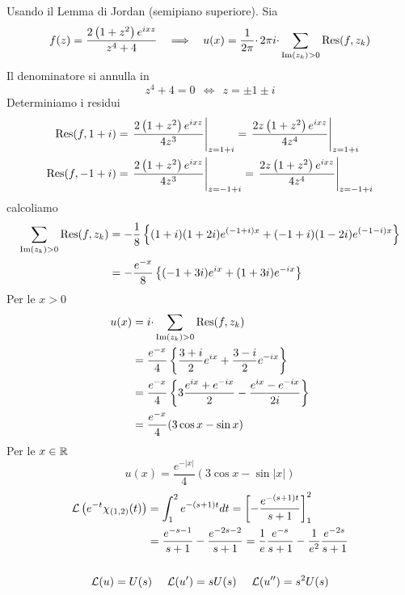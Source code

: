 Usando il Lemma di Jordan (semipiano superiore). Sia
\begin{equation*}
f( z) =\frac{2\left( 1+z^{2}\right) e^{ixz}}{z^{4} +4} \ \ \implies \ \ u( x) =\frac{1}{2\pi } \cdotp 2\pi i\cdotp \sum _{\operatorname{Im} ( z_{k})  >0}\operatorname{Res} ( f,z_{k})
\end{equation*}
Il denominatore si annulla in
\begin{equation*}
z^{4} +4=0\ \ \iff \ \ z=\pm 1\pm i
\end{equation*}
Determiniamo i residui
\begin{align*}
\operatorname{Res} ( f,1+i) & =\left. \frac{2\left( 1+z^{2}\right) e^{ixz}}{4z^{3}}\right| _{z=1+i} =\left. \frac{2z\left( 1+z^{2}\right) e^{ixz}}{4z^{4}}\right| _{z=1+i}\\
\operatorname{Res} ( f,-1+i) & =\left. \frac{2\left( 1+z^{2}\right) e^{ixz}}{4z^{3}}\right| _{z=-1+i} =\left. \frac{2z\left( 1+z^{2}\right) e^{ixz}}{4z^{4}}\right| _{z=-1+i}
\end{align*}
calcoliamo
\begin{align*}
\sum _{\operatorname{Im} ( z_{k})  >0}\operatorname{Res} ( f,z_{k}) & =-\frac{1}{8}\left\{( 1+i)( 1+2i) e^{( -1+i) x} +( -1+i)( 1-2i) e^{( -1-i) x}\right\}\\
 & =-\frac{e^{-x}}{8}\left\{( -1+3i) e^{ix} +( 1+3i) e^{-ix}\right\}
\end{align*}
Per le $x >0$
\begin{align*}
u( x) & =i\cdotp \sum _{\operatorname{Im} ( z_{k})  >0}\operatorname{Res} ( f,z_{k})\\
 & =\frac{e^{-x}}{4}\left\{\frac{3+i}{2} e^{ix} +\frac{3-i}{2} e^{-ix}\right\}\\
 & =\frac{e^{-x}}{4}\left\{3\frac{e^{ix} +e^{-ix}}{2} -\frac{e^{ix} -e^{-ix}}{2i}\right\}\\
 & =\frac{e^{-x}}{4}( 3\cos x-\sin x)
\end{align*}
Per le $x\in \mathbb{R} $
\begin{equation*}
u( x) =\frac{e^{-| x| }}{4}( 3\cos x-\sin| x| )
\end{equation*}
\Soluzione
\begin{gather*}
\begin{aligned}
\mathcal{L}\left( e^{-t} \chi _{( 1,2)}( t)\right) & =\int ^{2}_{1} e^{-( s+1) t} dt=\left[ -\frac{e^{-( s+1) t}}{s+1}\right]^{2}_{1}\\
 & =\frac{e^{-s-1}}{s+1} -\frac{e^{-2s-2}}{s+1} =\frac{1}{e}\frac{e^{-s}}{s+1} -\frac{1}{e^{2}}\frac{e^{-2s}}{s+1}
\end{aligned}\\
\\
\mathcal{L}( u) =U( s) \ \ \ \ \mathcal{L}( u') =sU( s) \ \ \ \ \mathcal{L}( u'') =s^{2} U( s)
\end{gather*}
